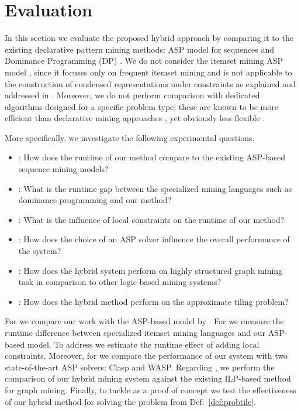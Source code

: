 \section{Evaluation}\label{sec:eval}
In this section we evaluate the proposed hybrid approach by comparing it to the existing declarative pattern mining methods: ASP model for sequences \parencite{DBLP:conf/ijcai/GebserGQ0S16} and Dominance Programming (DP) \parencite{dp2013}. We do not consider the itemset mining ASP model \parencite{DBLP:conf/lpnmr/Jarvisalo11},  
since %
it focuses only on frequent itemset mining and is not applicable to the 
construction of condensed representations under constraints as explained and addressed in \parencite{dp2013}. Moreover, we do not perform comparison with dedicated algorithms designed for a specific problem type; these are known to be more efficient  than declarative mining approaches \parencite{DBLP:conf/cpaior/NegrevergneG15}, yet obviously less flexible . 

More specifically, we investigate the following experimental questions. %

\begin{itemize} \setlength{\itemsep}{5pt}
  \item \qone: How does the runtime of our method compare to the existing ASP-based sequence mining models?
  \item \qtwo: What is the runtime gap between the specialized mining languages such as dominance programming and our method?
  \item \qthree: What is the influence of local constraints on the %
runtime of %
our method? 
  \item \qfour: How does the choice of an ASP solver influence the overall performance of the system?
  \item \qfive: How does the hybrid system perform on highly structured graph mining task in comparison to other logic-based mining systems?
\item \qsix: How does the hybrid method perform on the approximate tiling problem?
\end{itemize}

For \qone we compare our work with the ASP-based model by 
\textcite{DBLP:conf/ijcai/GebserGQ0S16}. For \qtwo we measure 
the runtime difference between specialized itemset mining languages \parencite{dp2013}
and our ASP-based model.  To address \qthree we estimate the runtime effect of adding local constraints. Moreover, for \qfour we compare the performance of our system with two state-of-the-art ASP solvers: Clasp and WASP. Regarding \qfive, we perform the comparison of our hybrid mining system against the existing ILP-based method for graph mining. Finally, to tackle \qsix as a proof of concept we test the effectiveness of our hybrid method for solving the problem from Def.~\ref{def:probtile}. %

